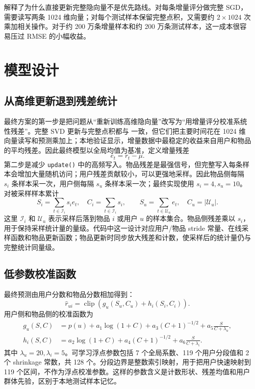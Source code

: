 \documentclass[UTF8,zihao=-4,scheme=plain]{ctexart}
\begin{document}
 解释了为什么直接更新完整隐向量不是优先路线。对每条增量评分做完整 SGD，需要读写两条 1024 维向量；对每个测试样本保留完整点积，又需要约 $2\times1024$ 次乘加相关操作。对于约 200 万条增量样本和约 200 万条测试样本，这一成本很容易压过 RMSE 的小幅收益。

\section{模型设计}

\subsection{从高维更新退到残差统计}

最终方案的第一步是把问题从“重新训练高维隐向量”改写为“用增量评分校准系统性残差”。完整 SVD 更新与完整点积都与  一致，但它们把主要时间花在 1024 维向量读写和预测乘加上；本地验证显示，增量数据中最稳定的收益来自用户和物品的平均残差。因此最终模型以全局均值为基准，定义增量残差
\begin{equation}
e_t=r_t-\mu .
\label{eq:residual}
\end{equation}
第二步是减少 \texttt{update()} 中的高频写入。物品残差是最强信号，但完整写入每条样本会增加大量随机访问；用户残差贡献较小，可以更强地采样。因此物品侧每隔 $s_i$ 条样本采一次，用户侧每隔 $s_u$ 条样本采一次；最终实现使用 $s_i=4,s_u=10$。对被采样样本累计
\begin{equation}
S_i=\sum_{t\in\mathcal I_i}s_i e_t,\quad C_i=\sum_{t\in\mathcal I_i}s_i,\qquad
S_u=\sum_{t\in\mathcal U_u}e_t,\quad C_u=|\mathcal U_u|.
\label{eq:stats}
\end{equation}
这里 $\mathcal I_i$ 和 $\mathcal U_u$ 表示采样后落到物品 $i$ 或用户 $u$ 的样本集合。物品侧残差乘以 $s_i$，用于保持采样统计量的量级。代码中这一设计对应用户/物品 stride 常量、在线采样函数和物品更新函数；物品更新时同步放大残差和计数，使采样后的统计量仍与完整统计同量级。

\subsection{低参数校准函数}

最终预测由用户分数和物品分数相加得到：
\begin{equation}
\hat r_{ui}=\operatorname{clip}\left(g_u(S_u,C_u)+h_i(S_i,C_i)\right).
\label{eq:pred}
\end{equation}
用户侧和物品侧的校准函数为
\begin{align}
g_u(S,C)&=p(u)+a_1\log(1+C)+a_3(C+1)^{-1/2}+a_5\frac{S}{C+\lambda_u},\\
h_i(S,C)&=a_2\log(1+C)+a_4(C+1)^{-1/2}+a_6\frac{S}{C+\lambda_i}.
\end{align}
其中 $\lambda_u=20,\lambda_i=5$。可学习浮点参数包括 7 个全局系数、119 个用户分段值和 2 个 shrinkage 常数，共 128 个。分段边界是整数索引映射，用于把用户快速映射到 119 个区间，不作为浮点校准参数。这样的参数含义是计数形状、残差均值和用户群体先验，区别于本地测试样本记忆。
\end{document}
